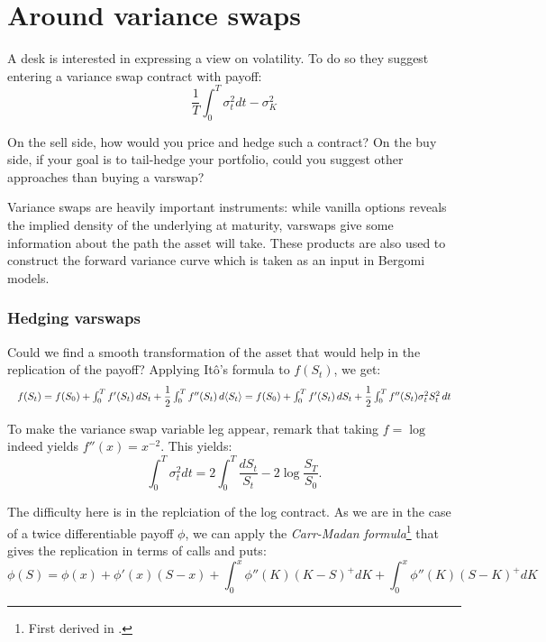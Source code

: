 \section{Around variance swaps}

\begin{tcolorbox}[width=\linewidth, sharp corners=all, colback=white!95!black]
    A desk is interested in expressing a view on volatility. To do so they suggest entering a variance swap contract with payoff:
    \[\dfrac{1}{T} \int_{0}^{T} \sigma_t^2 dt - \sigma_K^2\]

    On the sell side, how would you price and hedge such a contract?\newline
    On the buy side, if your goal is to tail-hedge your portfolio, could you suggest other approaches than buying a varswap?

\end{tcolorbox}

Variance swaps are heavily important instruments: while vanilla options reveals the implied density of the underlying at maturity, varswaps give some information about the path the asset will take. These products are also used to construct the forward variance curve which is taken as an input in Bergomi models.

\subsubsection*{Hedging varswaps}
Could we find a smooth transformation of the asset that would help in the replication of the payoff? Applying Itô's formula to $f(S_t)$, we get:
\begin{equation*}
        \resizebox{\hsize}{!}{$ f(S_t) = f(S_0) + \int_0^T f'(S_t) \,dS_t + \dfrac{1}{2} \int_0^T f''(S_t) \,d\langle S_t\rangle = f(S_0) + \int_0^T f'(S_t) \,dS_t + \dfrac{1}{2} \int_0^T f''(S_t) \sigma_t^2 S_t^2 \,dt $}
\end{equation*}


To make the variance swap variable leg appear, remark that taking $f = \log$ indeed yields $f''(x) = x^{-2}$.
This yields:
\[
    \int_{0}^{T} \sigma_t^2 dt = 2 \int_0^T \dfrac{dS_t}{S_t} - 2 \log \dfrac{S_T}{S_0}.
\]

The difficulty here is in the replciation of the log contract. As we are in the case of a twice differentiable payoff $\phi$, we can apply the \textit{Carr-Madan formula}\footnote{First derived in .} that gives the replication in terms of calls and puts:
\begin{equation}\label{eqn:carr-madan}
    \phi(S) = \phi(x) + \phi'(x)(S-x) + \int_0^x \phi''(K)(K-S)^{+} dK + \int_0^x \phi''(K)(S-K)^{+} dK
\end{equation}


